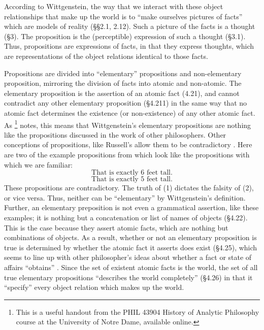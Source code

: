 \documentclass[man,12pt,natbib]{apa6}
\begin{document}
According to Wittgenstein, the way that we interact with these object
relationships that make up the world is to ``make ourselves pictures of facts''
which are models of reality (\S\S 2.1, 2.12). Such a picture of the facts is a
thought (\S 3). The proposition is the (perceptible) expression of such a
thought (\S 3.1). Thus, propositions are expressions of facts, in that they
express thoughts, which are representations of the object relations identical
to those facts.

Propositions are divided into ``elementary'' propositions and non-elementary
proposition, mirroring the division of facts into atomic and non-atomic. The
elementary proposition is the assertion of an atomic fact (4.21), and cannot
contradict any other elementary proposition (\S 4.211) in the same way that no
atomic fact determines the existence (or non-existence) of any other atomic
fact. As \citet{Speaks07}\footnote{This is a useful handout from the PHIL 43904
History of Analytic Philosophy course at the University of Notre Dame,
available online.} notes, this means that Wittgenstein's elementary
propositions are nothing like the propositions discussed in the work of other
philosophers. Other conceptions of propositions, like Russell's allow them to
be contradictory \citep{Klement15}. Here are two of the example propositions
from \citet{Speaks07} which look like the propositions with which we are
familiar:    
\begin{equation}
\text{That is exactly 6 feet tall.}
\end{equation}
\begin{equation}
\text{That is exactly 5 feet tall.}
\end{equation}
These propositions are contradictory. The truth of (1) dictates the falsity of
(2), or vice versa. Thus, neither can be ``elementary'' by Wittgenstein's
definition. Further, an elementary preposition is not even a grammatical
assertion, like these examples; it is nothing but a concatenation or list of
names of objects (\S 4.22). This is the case because they assert atomic facts,
which are nothing but combinations of objects. As a result, whether or not an
elementary proposition is true is determined by whether the atomic fact it
asserts does exist (\S 4.25), which seems to line up with other philosopher's
ideas about whether a fact or state of affairs ``obtains'' \citep{Mulligan13}.
Since the set of existent atomic facts is the world, the set of all true
elementary propositions “describes the world completely” (\S 4.26) in that it
``specify'' every object relation which makes up the world.
\end{document}
